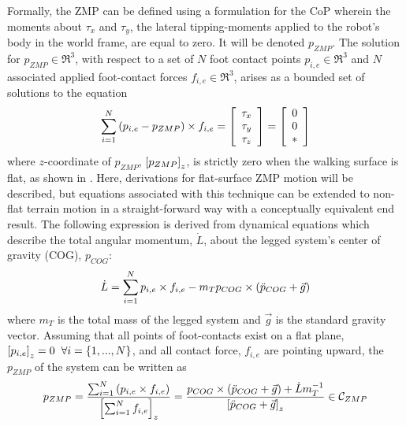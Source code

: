 		Formally, the ZMP can be defined using a formulation for the CoP wherein the moments about $\tau_{x}$ and $\tau_{y}$, the lateral tipping-moments applied to the robot's body in the world frame, are equal to zero. It will be denoted $p_{ZMP}$. The solution for $p_{ZMP}\in\Re^{3}$, with respect to a set of $N$ foot contact points $p_{i,e}\in\Re^{3}$ and $N$ associated applied foot-contact forces $f_{i,e}\in\Re^{3}$, arises as a bounded set of solutions to the equation
			\begin{equation}
				\sum^{N}_{i=1}\left(p_{i,e}-p_{ZMP}\right)\times f_{i,e} 
				= 
				\left[
					\begin{array}{c}
						\tau_{x}	\\
						\tau_{y}	\\
						\tau_{z}
					\end{array}
				\right]
				=
				\left[
					\begin{array}{c}
						0			\\
						0			\\
						*
					\end{array}
				\right]
			\end{equation}
		where $z$-coordinate of $p_{ZMP}$, $\left[p_{ZMP}\right]_{z}$, is strictly zero when the walking surface is flat, as shown in \cite{Wieber2015}. Here, derivations for flat-surface ZMP motion will be described, but equations associated with this technique can be extended to non-flat terrain motion in a straight-forward way with a conceptually equivalent end result. The following expression is derived from dynamical equations which describe the total angular momentum, $\dot{L}$, about the legged system's center of gravity (COG), $p_{COG}$:
			\begin{equation}
				\dot{L} = \sum_{i=1}^{N} p_{i,e}\times f_{i,e} - m_{T} p_{COG} \times \left( \ddot{p}_{COG} + \vec{g} \right)
			\end{equation}
		where $m_{T}$ is the total mass of the legged system and $\vec{g}$ is the standard gravity vector. Assuming that all points of foot-contacts exist on a flat plane, \IE $\left[p_{i,e}\right]_{z}=0\hspace{2mm} \forall i=\{1,...,N\}$, and all contact force, $f_{i,e}$ are pointing upward, the $p_{ZMP}$ of the system can be written as
			\begin{equation}
				p_{ZMP} 
				= 
				\frac{ \sum_{i=1}^{N} \left( p_{i,e} \times f_{i,e} \right) }{ \left[\sum_{i=1}^{N} f_{i,e}\right]_{z} }
				= 
				\frac{ 	p_{COG} \times \left( \ddot{p}_{COG} + \vec{g} \right) + \dot{L}m_{T}^{-1} }{ \left[ \ddot{p}_{COG} + \vec{g} \right]_{z}}
				\in {\cal C}_{ZMP} 
			\end{equation}
